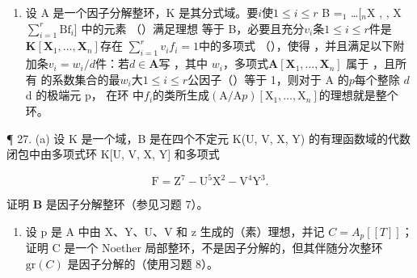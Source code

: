\begin{enumerate}
\def\labelenumi{\arabic{enumi}.}
\setcounter{enumi}{25}
\tightlist
\item
  设 A 是一个因子分解整环，K 是其分式域。要\(i\)使\(1 \leqslant i \leqslant r\) B {=}\(_{1}\) \ldots[\(_{n}\){}X  , , X  \(\sum_{i=1}^{r} \text{Bf}_i\)] 中的元素 （）满足理想  等于 B，必要且充分\(v_{i}\)条\(1 \leqslant i \leqslant r\)件是\(\mathbf{K}[\mathbf{X}_1, \ldots, \mathbf{X}_n]\)存在  \(\sum_{i=1}^{r} v_i f_i = 1\)中的多项式 （），使得 ，并且满足以下附加条\(v_i = w_i / d\)件：若\(d \in \mathbf{A}\)写 ，其中 \(w_i\)，多项式\(\mathbf{A}[\mathbf{X}_1, \ldots, \mathbf{X}_n]\)  属于 ，且所有  的系数集合的最\(w_i\)大\(1 \leqslant i \leqslant r\)公因子（）等于 1，则对于 A 的\(p\)每个整除 \(d\)d 的极端元 p， 在环  中\(f_i\)的类所生成\((\mathrm{A} / \mathrm{A}p)[\mathrm{X}_1, \ldots, \mathrm{X}_n]\)的理想就是整个环。
\end{enumerate}

¶ 27. (a) 设 K 是一个域，B 是在四个不定元 K(U, V, X, Y) 的有理函数域的代数闭包中由多项式环 K{[}U, V, X, Y{]} 和多项式

\[
\mathrm{F} = \mathrm{Z} ^ {7} - \mathrm{U} ^ {5} \mathrm{X} ^ {2} - \mathrm{V} ^ {4} \mathrm{Y} ^ {3}.
\]

证明 \(\mathbf{B}\) 是因子分解整环（参见习题 7）。

\begin{enumerate}
\def\labelenumi{(\alph{enumi})}
\setcounter{enumi}{1}
\tightlist
\item
  设 p 是 A 中由 X、Y、U、V 和 z 生成的（素）理想，并记 \(C = A_{p}[[T]]\)；证明 C 是一个 Noether 局部整环，不是因子分解的，但其伴随分次整环 \(\text{gr}(C)\) 是因子分解的（使用习题 8）。
\end{enumerate}
